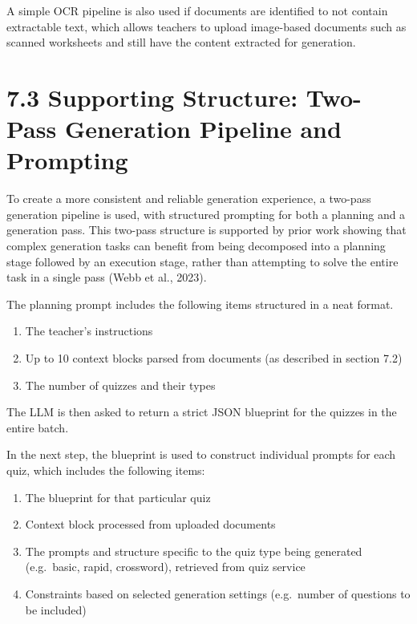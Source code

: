 \documentclass[
  12pt,
  a4paper,
]{report}
\providecommand{\tightlist}{%
  \setlength{\itemsep}{0pt}\setlength{\parskip}{0pt}}
\begin{document}
A simple OCR pipeline is also used if documents are identified to not
contain extractable text, which allows teachers to upload image-based
documents such as scanned worksheets and still have the content extracted for
generation.

\hypertarget{generation-pipeline-and-prompting-strategies}{%
\section{7.3 Supporting Structure: Two-Pass Generation Pipeline and
Prompting}\label{generation-pipeline-and-prompting-strategies}}

To create a more consistent and reliable generation experience,
a two-pass generation pipeline is used, with structured prompting
for both a planning and a generation pass.
This two-pass structure is supported by prior work showing that complex
generation tasks can benefit from being decomposed into a planning stage
followed by an execution stage, rather than attempting to solve the
entire task in a single pass (Webb et al., 2023).


The planning prompt includes the following items structured in a neat
format.

\begin{enumerate}
\def\labelenumi{\arabic{enumi}.}
\tightlist
\item
  The teacher's instructions
\item
  Up to 10 context blocks parsed from documents (as described in section
  7.2)
\item
  The number of quizzes and their types
\end{enumerate}

The LLM is then asked to return a strict JSON blueprint for the quizzes in
the entire batch.

In the next step, the blueprint is used to construct individual prompts for each quiz,
which includes the following items:

\begin{enumerate}
\def\labelenumi{\arabic{enumi}.}
\tightlist
\item
  The blueprint for that particular quiz
\item
  Context block processed from uploaded documents
\item
  The prompts and structure specific to the quiz type being generated
  (e.g.~basic, rapid, crossword), retrieved from quiz service
\item
  Constraints based on selected generation settings
  (e.g.~number of questions to be included)
\end{enumerate}
\end{document}

